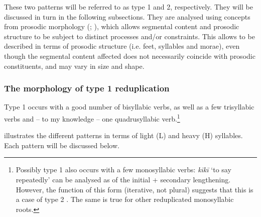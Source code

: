 These two patterns will be referred to as type 1 and 2, respectively. They will be discussed in turn in the following subsections. They are analysed using concepts from prosodic morphology (\citealt{McCarthyPrince1995,McCarthyPrince1996}; \citealt{InkelasZec1995}), which allows segmental content and prosodic structure to be subject to distinct processes and/or constraints. This allows  to be described in terms of prosodic structure (i.e. feet, syllables and morae), even though the segmental content affected does not necessarily coincide with prosodic constituents, and may vary in size and shape.

\subsubsection[The morphology of type 1 \isi{reduplication}]{The morphology of type 1 reduplication}\label{sec:2.6.1.1}
Type 1  occurs with a good number of bisyllabic verbs, as well as a few trisyllabic verbs and – to my knowledge – one quadrusyllabic verb.\footnote{\label{fn:72}Possibly type 1  also occurs with a few monosyllabic verbs: \textit{kīkī} ‘to say repeatedly’ can be analysed as  of the initial  + secondary lengthening. However, the function of this form (iterative, not plural) suggests that this is a case of type 2 . The same is true for other reduplicated monosyllabic roots.} 

 illustrates the different patterns in terms of light (L) and heavy (H) syllables. Each pattern will be discussed below.

